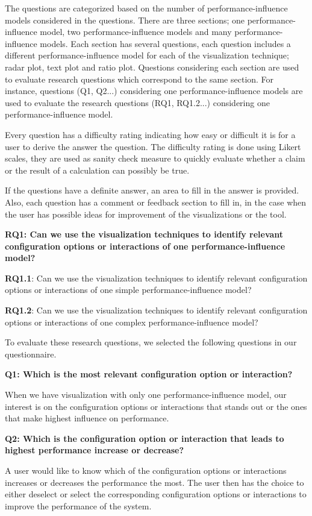 The questions are categorized based on the number of performance-influence models considered in the questions. There are three sections; one performance-influence model, two performance-influence models and many performance-influence models. Each section has several questions, each question includes a different performance-influence model for each of the visualization technique; radar plot, text plot and ratio plot. Questions considering each section are used to evaluate research questions which correspond to the same section. For instance, questions (Q1, Q2...) considering one performance-influence models are used to evaluate the research questions (RQ1, RQ1.2...) considering one performance-influence model.

Every question has a difficulty rating indicating how easy or difficult it is for a user to derive the answer the question. The difficulty rating is done using Likert scales, they are used as sanity check measure to quickly evaluate whether a claim or the result of a calculation can possibly be true.

If the questions have a definite answer, an area to fill in the answer is provided. Also, each question has a comment or feedback section to fill in, in the case when the user has possible ideas for improvement of the visualizations or the tool.


\textbf{RQ1: Can we use the visualization techniques to identify relevant configuration options or interactions of one performance-influence model?}

\begin{myindentpar}{0.5cm}
\textbf{RQ1.1}: Can we use the visualization techniques to identify relevant configuration options or interactions of one simple performance-influence model?

\textbf{RQ1.2}: Can we use the visualization techniques to identify relevant configuration options or interactions of one complex performance-influence model?

To evaluate these research questions, we selected the following questions in our questionnaire.


\textbf{Q1: Which is the most relevant configuration option or interaction?}

When we have visualization with only one performance-influence model, our interest is on the configuration options or interactions that stands out or the ones that make highest influence on performance. 

\textbf{Q2: Which is the configuration option or interaction that leads to highest performance increase or decrease?}

A user would like to know which of the configuration options or interactions increases or decreases the performance the most. The user then has the choice to either deselect or select the corresponding configuration options or interactions to improve the performance of the system.
\end{myindentpar}

